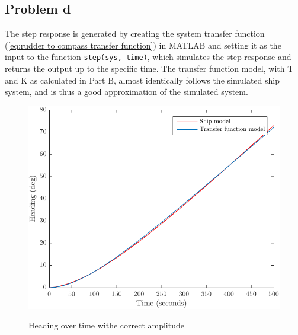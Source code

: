 \subsection{Problem d}
The step response is generated by creating the system transfer function (\cref{eq:rudder to compass transfer function}) in MATLAB and setting it as the input to the function {\texttt{step(sys, time)}}, which simulates the step response and returns the output up to the specific time. The transfer function model, with T and K as calculated in Part B, almost identically follows the simulated ship system, and is thus a good approximation of the simulated system.

\begin{figure}[ht]
    \centering
    \begin{minipage}[b]{0.48\textwidth}
        \includegraphics[width=\textwidth]{"images/1d-riktig_amplitude"}
        \label{fig:1d-riktig_amplitude}
        \caption{Heading over time withe correct amplitude}
    \end{minipage}
\end{figure}